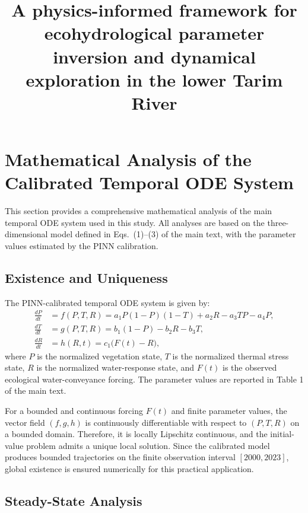 \documentclass[12pt,a4paper]{article}
\title{A physics-informed framework for ecohydrological parameter inversion and dynamical exploration in the lower Tarim River}
\date{}
\begin{document}
	\maketitle
	
	\tableofcontents
	\clearpage
\section{Mathematical Analysis of the Calibrated Temporal ODE System}
\label{sec:s1}
This section provides a comprehensive mathematical analysis of the main temporal ODE system used in this study. All analyses are based on the three-dimensional model defined in Eqs.~(1)--(3) of the main text, with the parameter values estimated by the PINN calibration.

\subsection{Existence and Uniqueness}

The PINN-calibrated temporal ODE system is given by:
\begin{equation}
	\begin{aligned}
		\frac{dP}{dt} &= f(P,T,R) = a_1P(1-P)(1-T)+a_2R-a_3TP-a_4P, \\
		\frac{dT}{dt} &= g(P,T,R) = b_1(1-P)-b_2R-b_3T, \\
		\frac{dR}{dt} &= h(R,t) = c_1\bigl(F(t)-R\bigr),
	\end{aligned}
	\label{eq:s1_ode}
\end{equation}
where $P$ is the normalized vegetation state, $T$ is the normalized thermal stress state, $R$ is the normalized water-response state, and $F(t)$ is the observed ecological water-conveyance forcing. The parameter values are reported in Table 1 of the main text.

For a bounded and continuous forcing $F(t)$ and finite parameter values, the vector field $(f,g,h)$ is continuously differentiable with respect to $(P,T,R)$ on a bounded domain. Therefore, it is locally Lipschitz continuous, and the initial-value problem admits a unique local solution. Since the calibrated model produces bounded trajectories on the finite observation interval $[2000, 2023]$, global existence is ensured numerically for this practical application.

\subsection{Steady-State Analysis}
\end{document}
